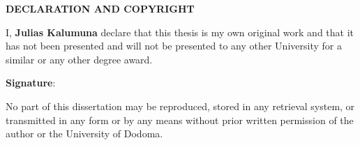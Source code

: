 \begin{center}
{\large \textbf{DECLARATION AND COPYRIGHT}} \\
\vspace{1in}
\end{center}
I, \textbf{Julias Kalumuna} declare that this thesis is my own original work and that it has not been presented and will not be presented to any other University for a similar or any other degree award. \\
\vspace{1.5in}
\begin{center}
\textbf{Signature}: \makebox[2.5in]{\hrulefill}\\
\end{center}
\vspace{1.0in}
No part of this dissertation may be reproduced, stored in any retrieval system, or transmitted in any form or by any means without prior written permission of the author or the University of Dodoma.
\newpage